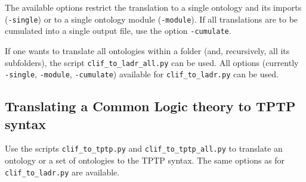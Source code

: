 \documentclass{article}
\begin{document}
The available options restrict the translation to a single ontology and its imports (\texttt{-single}) or to a single ontology module (\texttt{-module}). If all translations are to be cumulated into a single output file, use the option \texttt{-cumulate}.

If one wants to translate all ontologies within a folder (and, recursively, all its subfolders), the script \texttt{clif\_to\_ladr\_all.py} can be used. All options (currently \texttt{-single}, \texttt{-module}, \texttt{-cumulate}) available for \texttt{clif\_to\_ladr.py} can be used.


\subsection{Translating a Common Logic theory to TPTP syntax}

Use the scripts \texttt{clif\_to\_tptp.py} and \texttt{clif\_to\_tptp\_all.py} to translate an ontology or a set of ontologies to the TPTP syntax. The same options as for \texttt{clif\_to\_ladr.py} are available. 
\end{document}
